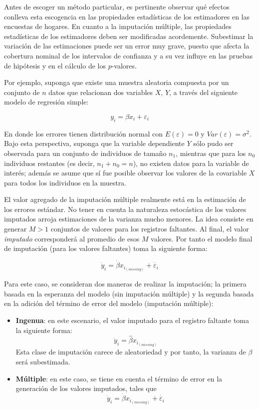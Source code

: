 \documentclass[
  10pt,
  spanish,
]{book}
\providecommand{\tightlist}{%
  \setlength{\itemsep}{0pt}\setlength{\parskip}{0pt}}
\begin{document}
Antes de escoger un método particular, es pertinente observar qué efectos conlleva esta escogencia en las propiedades estadísticas de los estimadores en las encuestas de hogares. En cuanto a la imputación múltiple, las propiedades estadísticas de los estimadores deben ser modificadas acordemente. Subestimar la variación de las estimaciones puede ser un error muy grave, puesto que afecta la cobertura nominal de los intervalos de confianza y a su vez influye en las pruebas de hipótesis y en el cálculo de los \(p\)-valores.

Por ejemplo, suponga que existe una muestra aleatoria compuesta por un conjunto de \(n\) datos que relacionan dos variables \(X\), \(Y\), a través del siguiente modelo de regresión simple:

\[
y_i = \beta x_i + \varepsilon_i
\]

En donde los errores tienen distribución normal con \(E(\varepsilon) = 0\) y \(Var(\varepsilon) = \sigma ^2\). Bajo esta perspectiva, suponga que la variable dependiente \(Y\) sólo pudo ser observada para un conjunto de individuos de tamaño \(n_1\), mientras que para los \(n_0\) individuos restantes (es decir, \(n_1 + n_0 = n\)), no existen datos para la variable de interés; además se asume que sí fue posible observar los valores de la covariable \(X\) para todos los individuos en la muestra.

El valor agregado de la imputación múltiple \citep{Rubin_1987} realmente está en la estimación de los errores estándar. No tener en cuenta la naturaleza estocástica de los valores imputados arroja estimaciones de la varianza mucho menores. La idea consiste en generar \(M > 1\) conjuntos de valores para los registros faltantes. Al final, el valor \emph{imputado} corresponderá al promedio de esos \(M\) valores. Por tanto el modelo final de imputación (para los valores faltantes) toma la siguiente forma:

\[\dot{y}_i = \dot{\beta} x_{i_{(missing)}}+ \dot{\varepsilon_i}\]

Para este caso, se consideran dos maneras de realizar la imputación; la primera basada en la esperanza del modelo (sin imputación múltiple) y la segunda basada en la adición del término de error del modelo (imputación múltiple):

\begin{itemize}
\tightlist
\item
  \textbf{Ingenua}: en este escenario, el valor imputado para el registro faltante toma la siguiente forma:
  \[
  \dot{y}_i = \hat\beta x_{i_{(missing)}}
  \]
  Esta clase de imputación carece de aleatoriedad y por tanto, la varianza de \(\beta\) será subestimada.
\item
  \textbf{Múltiple}: en este caso, se tiene en cuenta el término de error en la generación de los valores imputados, tales que
  \[
  \dot{y}_i = \dot{\beta} x_{i_{(missing)}}+ \dot{\varepsilon_i}
  \]
\end{itemize}
\end{document}

